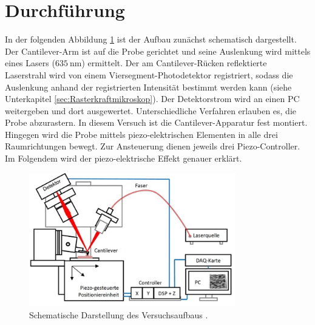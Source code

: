 \section{Durchführung}
\label{sec:Durchführung}

In der folgenden Abbildung \ref{fig:Aufbau} ist der Aufbau zunächst schematisch
dargestellt. Der Cantilever-Arm ist auf die Probe gerichtet und seine
Auslenkung wird mittels eines Lasers ($\SI{635}{\nano\meter}$) ermittelt. Der
am Cantilever-Rücken reflektierte Laserstrahl wird von einem
Viersegment-Photodetektor registriert, sodass die Auslenkung anhand der
registrierten Intensität bestimmt werden kann (siehe Unterkapitel
\ref{sec:Rasterkraftmikroskop}). Der Detektorstrom wird an einen PC weitergeben
und dort ausgewertet. Unterschiedliche Verfahren erlauben es, die Probe abzurastern.
In diesem Versuch ist die Cantilever-Apparatur fest montiert. Hingegen wird die
Probe mittels piezo-elektrischen Elementen in alle drei Raumrichtungen bewegt.
Zur Ansteuerung dienen jeweils drei Piezo-Controller. Im Folgendem wird der
piezo-elektrische Effekt genauer erklärt.

\begin{figure}[H]
	\centering
	\includegraphics[width=0.8\textwidth]{Abb/Aufbau.png}
	\caption{Schematische Darstellung des Versuchsaufbaus	\cite[2]{anleitung}.}
	\label{fig:Aufbau}
\end{figure}

